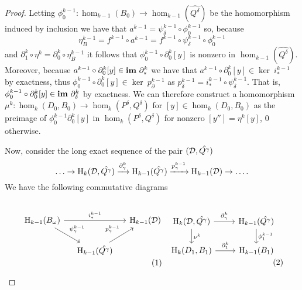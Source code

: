 \begin{proof}
  Letting $\phi_0^{k-1} : \hom_{k-1}(B_0)\to\hom_{k-1}(\hat{Q^\delta})$ be the homomorphism induced by inclusion we have that $a^{k-1} = \psi_\delta^{k-1}\circ\phi_0^{k-1}$ so, because
  \[\eta_B^{k-1} = f^{k-1}\circ a^{k-1} = f^{k-1}\circ \psi_\delta^{k-1}\circ\phi_0^{k-1}\]
  and $\partial_1^k\circ\eta^k = \partial_0^k\circ \eta_B^{k-1}$ it follows that $\phi_0^{k-1}\circ\partial_0^k[y]$ is nonzero in $\hom_{k-1}(\hat{Q^\delta})$.
  Moreover, because $a^{k-1}\circ\partial_0^k[y]\in\mathbf{im}~\partial_*^k$ we have that $a^{k-1}\circ\partial_0^k[y]\in\ker~i_*^{k-1}$ by exactness, thus
  $\phi_0^{k-1}\circ\partial_0^k[y]\in \ker~p_\partial^{k-1}$ as $p_\delta^{k-1} = i_*^{k-1}\circ\psi_\delta^{k-1}$.
  That is, $\phi_0^{k-1}\circ\partial_0^k[y]\in \mathbf{im}~\partial_\delta^{k}$ by exactness.
  We can therefore construct a homomorphism $\mu^k : \hom_k(D_0, B_0) \to \hom_k(P^\delta, Q^\delta)$ for $[y]\in \hom_k(D_0, B_0)$ as the preimage of $\phi_0^{k-1}\partial_0^k[y]$ in $\hom_k(P^\delta, Q^\delta)$ for nonzero $[y''] = \eta^k[y]$, $0$ otherwise.


  Now, consider the long exact sequence of the pair $({\mathcal{D}}, \hat{Q^\gamma})$
  \[\ldots\to\mathrm{H}_k({\mathcal{D}}, \hat{Q^\gamma})\xrightarrow{\partial^k_\gamma}
    \mathrm{H}_{k-1}(\hat{Q^\gamma})\xrightarrow{p^{k-1}_\gamma}
    \mathrm{H}_{k-1}({\mathcal{D}})\to\ldots.\]
  We have the following commutative diagrams

  \begin{small}\begin{subequations}\label{eq:main2}
  \begin{minipage}{0.5\textwidth}\begin{equation}\label{eq:main2a}\begin{tikzcd}[column sep=small]
      \hom_{k-1}(\B)\arrow{dr}{\psi_\gamma^{k-1}}\arrow{rr}{i_*^{k-1}} & &
      \hom_{k-1}(\D)\\
    & \hom_{k-1}(\hat{Q^\gamma})\arrow{ur}{p_\gamma^{k-1}}
  \end{tikzcd}\end{equation}\end{minipage}
  \begin{minipage}{0.43\textwidth}\begin{equation}\label{eq:main2b}\begin{tikzcd}
    \hom_{k}(\D, \hat{Q^\gamma})\arrow{r}{\partial_\gamma^k}\arrow{d}{\nu^k} &
    \hom_{k-1}(\hat{Q^\gamma})\arrow{d}{\phi_1^{k-1}}\\
    \hom_{k}(D_1, B_1)\arrow{r}{\partial_1^k} &
    \hom_{k-1}(B_1)
  \end{tikzcd}\end{equation}\end{minipage}
  \end{subequations}\end{small}\vspace{2ex}


\end{proof}
